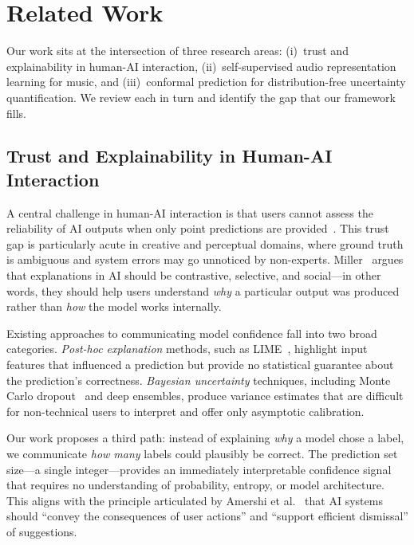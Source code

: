 
\section{Related Work}
\label{sec:related}

Our work sits at the intersection of three research areas: (i)~trust and
explainability in human-AI interaction, (ii)~self-supervised audio
representation learning for music, and (iii)~conformal prediction for
distribution-free uncertainty quantification. We review each in turn and
identify the gap that our framework fills.

\subsection{Trust and Explainability in Human-AI Interaction}

A central challenge in human-AI interaction is that users cannot assess the
reliability of AI outputs when only point predictions are
provided~\cite{amershi2019guidelines}. This trust gap is particularly acute in
creative and perceptual domains, where ground truth is ambiguous and system
errors may go unnoticed by non-experts. Miller~\cite{miller2019explanation}
argues that explanations in AI should be contrastive, selective, and social---in
other words, they should help users understand \emph{why} a particular output
was produced rather than \emph{how} the model works internally.

Existing approaches to communicating model confidence fall into two broad
categories. \emph{Post-hoc explanation} methods, such as
LIME~\cite{ribeiro2016lime}, highlight input features that influenced a
prediction but provide no statistical guarantee about the prediction's
correctness. \emph{Bayesian uncertainty} techniques, including Monte Carlo
dropout~\cite{gal2016dropout} and deep ensembles, produce variance estimates
that are difficult for non-technical users to interpret and offer only
asymptotic calibration.

Our work proposes a third path: instead of explaining \emph{why} a model chose a
label, we communicate \emph{how many} labels could plausibly be correct. The
prediction set size---a single integer---provides an immediately interpretable
confidence signal that requires no understanding of probability, entropy, or
model architecture. This aligns with the principle articulated by Amershi et
al.~\cite{amershi2019guidelines} that AI systems should ``convey the
consequences of user actions'' and ``support efficient dismissal'' of
suggestions.


